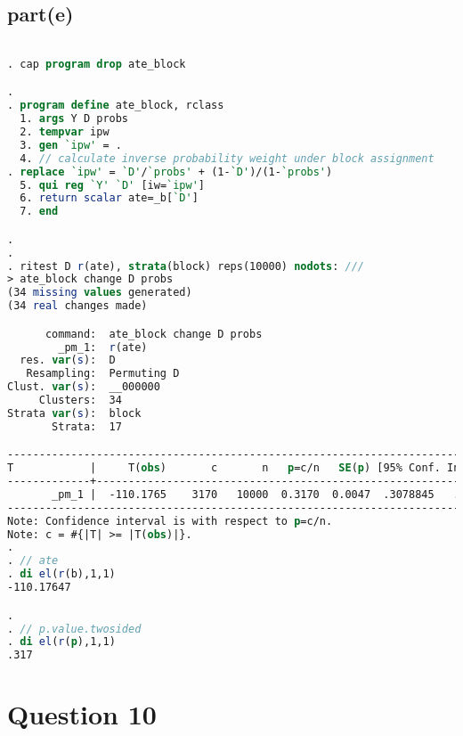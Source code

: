 \documentclass[a4paper]{article}
\begin{document}
\subsection*{part(e)}
\begin{lstlisting}[language=stata]

. cap program drop ate_block

. 
. program define ate_block, rclass
  1. args Y D probs
  2. tempvar ipw
  3. gen `ipw' = .
  4. // calculate inverse probability weight under block assignment
. replace `ipw' = `D'/`probs' + (1-`D')/(1-`probs')
  5. qui reg `Y' `D' [iw=`ipw']
  6. return scalar ate=_b[`D']
  7. end 

. 
. 
. ritest D r(ate), strata(block) reps(10000) nodots: ///
> ate_block change D probs
(34 missing values generated)
(34 real changes made)

      command:  ate_block change D probs
        _pm_1:  r(ate)
  res. var(s):  D
   Resampling:  Permuting D
Clust. var(s):  __000000
     Clusters:  34
Strata var(s):  block
       Strata:  17

------------------------------------------------------------------------------
T            |     T(obs)       c       n   p=c/n   SE(p) [95% Conf. Interval]
-------------+----------------------------------------------------------------
       _pm_1 |  -110.1765    3170   10000  0.3170  0.0047  .3078845   .3262222
------------------------------------------------------------------------------
Note: Confidence interval is with respect to p=c/n.
Note: c = #{|T| >= |T(obs)|}. 
. 
. // ate
. di el(r(b),1,1)
-110.17647

. 
. // p.value.twosided
. di el(r(p),1,1)
.317
\end{lstlisting}

\section*{Question 10}
\end{document}
